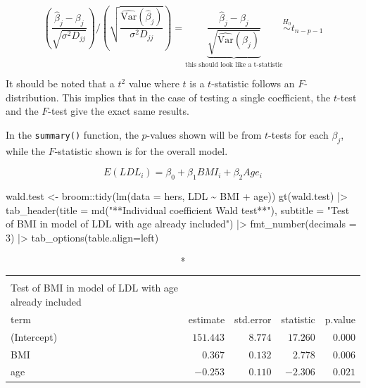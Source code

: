 \documentclass[
  letterpaper,
  DIV=11,
  numbers=noendperiod]{scrreport}
\newenvironment{Shaded}{\begin{snugshade}}{\end{snugshade}}
\newcommand{\AttributeTok}[1]{\textcolor[rgb]{0.40,0.45,0.13}{#1}}
\newcommand{\DecValTok}[1]{\textcolor[rgb]{0.68,0.00,0.00}{#1}}
\newcommand{\FunctionTok}[1]{\textcolor[rgb]{0.28,0.35,0.67}{#1}}
\newcommand{\NormalTok}[1]{\textcolor[rgb]{0.00,0.23,0.31}{#1}}
\newcommand{\OtherTok}[1]{\textcolor[rgb]{0.00,0.23,0.31}{#1}}
\newcommand{\SpecialCharTok}[1]{\textcolor[rgb]{0.37,0.37,0.37}{#1}}
\newcommand{\StringTok}[1]{\textcolor[rgb]{0.13,0.47,0.30}{#1}}
\begin{document}
\[\left( \frac{\hat \beta_j - \beta_j}{\sqrt{\sigma^2 D_{jj}}} \right) \biggr / 
\left( \sqrt{\frac{\widehat{\text{Var}}(\hat \beta_j)}{\sigma^2D_{jj}}} \right) = \underbrace{\boxed{\frac{\hat \beta_j - \beta_j}{\sqrt{\widehat{\text{Var}}(\hat \beta_j)}}}}_{\text{this should look like a t-statistic}} \stackrel{H_0}{\sim} t_{n-p-1}\]

It should be noted that a \(t^2\) value where \(t\) is a \(t\)-statistic
follows an \(F\)-distribution. This implies that in the case of testing
a single coefficient, the \(t\)-test and the \(F\)-test give the exact
same results.

In the \texttt{summary()} function, the \(p\)-values shown will be from
\(t\)-tests for each \(\beta_j\), while the \(F\)-statistic shown is for
the overall model.

\[E(LDL_i) = \beta_0 + \beta_1 BMI_i + \beta_2 Age_i\]

\begin{Shaded}
\begin{Highlighting}[]
\NormalTok{wald.test }\OtherTok{\textless{}{-}}\NormalTok{ broom}\SpecialCharTok{::}\FunctionTok{tidy}\NormalTok{(}\FunctionTok{lm}\NormalTok{(}\AttributeTok{data =}\NormalTok{ hers, LDL }\SpecialCharTok{\textasciitilde{}}\NormalTok{ BMI }\SpecialCharTok{+}\NormalTok{ age))}
\FunctionTok{gt}\NormalTok{(wald.test) }\SpecialCharTok{|\textgreater{}} 
  \FunctionTok{tab\_header}\NormalTok{(}\AttributeTok{title =} 
               \FunctionTok{md}\NormalTok{(}\StringTok{"**Individual coefficient Wald test**"}\NormalTok{),}
             \AttributeTok{subtitle =} \StringTok{"Test of BMI in model of LDL with age already included"}\NormalTok{) }\SpecialCharTok{|\textgreater{}} 
  \FunctionTok{fmt\_number}\NormalTok{(}\AttributeTok{decimals =} \DecValTok{3}\NormalTok{) }\SpecialCharTok{|\textgreater{}} 
  \FunctionTok{tab\_options}\NormalTok{(}\AttributeTok{table.align=}\StringTok{\textquotesingle{}left\textquotesingle{}}\NormalTok{)}
\end{Highlighting}
\end{Shaded}

\begin{longtable}{lrrrr}
\caption*{
{\large \textbf{Individual coefficient Wald test}} \\ 
{\small Test of BMI in model of LDL with age already included}
} \\ 
\toprule
term & estimate & std.error & statistic & p.value \\ 
\midrule
(Intercept) & $151.443$ & $8.774$ & $17.260$ & $0.000$ \\ 
BMI & $0.367$ & $0.132$ & $2.778$ & $0.006$ \\ 
age & $-0.253$ & $0.110$ & $-2.306$ & $0.021$ \\ 
\bottomrule
\end{longtable}
\end{document}
